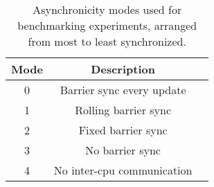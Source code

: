 \begin{table}
  \begin{tabular}{ccl}
    \toprule
    Mode & Description\\
    \midrule
    0 & Barrier sync every update\\
    1 & Rolling barrier sync\\
    2 & Fixed barrier sync\\
    3 & No barrier sync\\
    4 & No inter-cpu communication\\
  \bottomrule
\end{tabular}
  \caption{Asynchronicity modes used for benchmarking experiments, arranged from most to least synchronized.}
  \label{tab:asynchronicity_modes}
\end{table}

